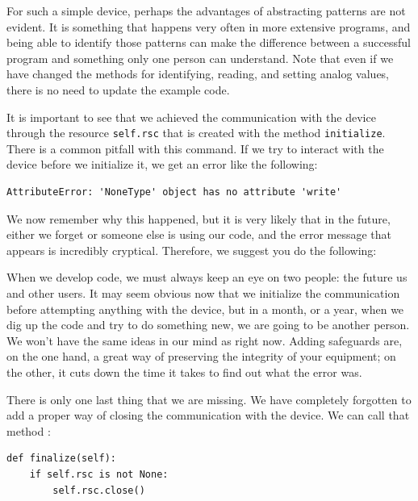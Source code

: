 For such a simple device, perhaps the advantages of abstracting patterns are not evident. It is something that happens very often in more extensive programs, and being able to identify those patterns can make the difference between a successful program and something only one person can understand. Note that even if we have changed the methods for identifying, reading, and setting analog values, there is no need to update the example code.

It is important to see that we achieved the communication with the device through the resource \texttt{self.rsc} that is created with the method \texttt{initialize}. There is a common pitfall with this command. If we try to interact with the device before we initialize it, we get an error like the following:

\begin{verbatim}
AttributeError: 'NoneType' object has no attribute 'write'
\end{verbatim}

We now remember why this happened, but it is very likely that in the future, either we forget or someone else is using our code, and the error message that appears is incredibly cryptical. Therefore, we suggest you do the following:


When we develop code, we must always keep an eye on two people: the future us and other users. It may seem obvious now that we initialize the communication before attempting anything with the device, but in a month, or a year, when we dig up the code and try to do something new, we are going to be another person. We won't have the same ideas in our mind as right now. Adding safeguards are, on the one hand, a great way of preserving the integrity of your equipment; on the other, it cuts down the time it takes to find out what the error was.

There is only one last thing that we are missing. We have completely forgotten to add a proper way of closing the communication with the device. We can call that method :

\begin{verbatim}
def finalize(self):
    if self.rsc is not None:
        self.rsc.close()
\end{verbatim}

